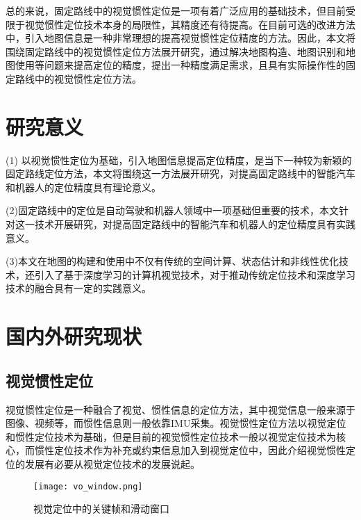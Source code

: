 总的来说，固定路线中的视觉惯性定位是一项有着广泛应用的基础技术，但目前受限于视觉惯性定位技术本身的局限性，其精度还有待提高。在目前可选的改进方法中，引入地图信息是一种非常理想的提高视觉惯性定位精度的方法。因此，本文将围绕固定路线中的视觉惯性定位方法展开研究，通过解决地图构造、地图识别和地图使用等问题来提高定位的精度，提出一种精度满足需求，且具有实际操作性的固定路线中的视觉惯性定位方法。


\section{研究意义}

(1) 以视觉惯性定位为基础，引入地图信息提高定位精度，是当下一种较为新颖的固定路线定位方法，本文将围绕这一方法展开研究，对提高固定路线中的智能汽车和机器人的定位精度具有理论意义。

(2)固定路线中的定位是自动驾驶和机器人领域中一项基础但重要的技术，本文针对这一技术开展研究，对提高固定路线中的智能汽车和机器人的定位精度具有实践意义。

(3)本文在地图的构建和使用中不仅有传统的空间计算、状态估计和非线性优化技术，还引入了基于深度学习的计算机视觉技术，对于推动传统定位技术和深度学习技术的融合具有一定的实践意义。


\section{国内外研究现状}
\subsection{视觉惯性定位}

视觉惯性定位是一种融合了视觉、惯性信息的定位方法，其中视觉信息一般来源于图像、视频等，而惯性信息则一般依靠IMU采集。视觉惯性定位方法以视觉定位和惯性定位技术为基础，但是目前的视觉惯性定位技术一般以视觉定位技术为核心，而惯性定位技术作为补充或约束信息加入到视觉定位中，因此介绍视觉惯性定位的发展有必要从视觉定位技术的发展说起。


\begin{figure}
  \centering
  \texttt{[image: vo\_window.png]}
  \caption{视觉定位中的关键帧和滑动窗口}
  \label{fig:vo_window}
\end{figure}

